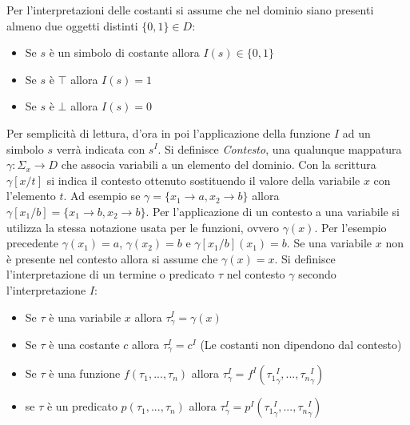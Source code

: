 \documentclass[./main.tex]{subfiles}
\begin{document}
Per l'interpretazioni delle costanti si assume che nel dominio siano presenti almeno due oggetti distinti $\{0, 1\} \in D$:
\begin{itemize}
  \item Se $s$ è un simbolo di costante allora $I(s) \in \{0, 1\}$
  \item Se $s$ è $\top$ allora $I(s) = 1$
  \item Se $s$ è $\bot$ allora $I(s) = 0$
\end{itemize}

Per semplicità di lettura, d'ora in poi l'applicazione della funzione $I$ ad un simbolo $s$ verrà indicata con $s^I$.
Si definisce \textit{Contesto}, una qualunque mappatura $\gamma : \Sigma_x \rightarrow D$ che associa variabili a un elemento del dominio.
Con la scrittura $\gamma[x/t]$ si indica il contesto ottenuto sostituendo il valore della variabile $x$ con l'elemento $t$.
Ad esempio se $\gamma = \{x_1 \rightarrow a, x_2 \rightarrow b\}$ allora $\gamma[x_1/b] = \{x_1 \rightarrow b, x_2 \rightarrow b\}$.
Per l'applicazione di un contesto a una variabile si utilizza la stessa notazione usata per le funzioni, ovvero $\gamma(x)$.
Per l'esempio precedente $\gamma(x_1) = a$, $\gamma(x_2) = b$ e $\gamma[x_1/b](x_1) = b$.
Se una variabile $x$ non è presente nel contesto allora si assume che $\gamma(x) = x$.
Si definisce l'interpretazione di un termine o predicato $\tau$ nel contesto $\gamma$ secondo l'interpretazione $I$:

\begin{itemize}
  \item Se $\tau$ è una variabile $x$ allora $\tau^I_\gamma = \gamma(x)$
  \item Se $\tau$ è una costante $c$ allora $\tau^I_\gamma = c^I$ (Le costanti non dipendono dal contesto)
  \item Se $\tau$ è una funzione $f(\tau_1, ..., \tau_n)$ allora $\tau^I_\gamma = f^I({\tau_1}^I_\gamma, ..., {\tau_n}^I_\gamma)$
  \item se $\tau$ è un predicato $p(\tau_1, ..., \tau_n)$ allora $\tau^I_\gamma = p^I({\tau_1}^I_\gamma, ..., {\tau_n}^I_\gamma)$
\end{itemize}
\end{document}
